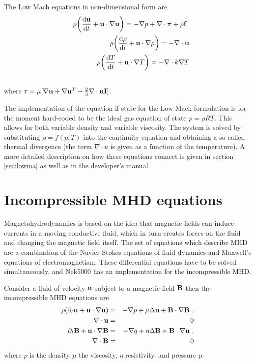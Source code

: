 The Low Mach equations in non-dimensional form are 
\begin{eqnarray}
&&\rho\bigg(\frac{\mathrm{d} \mathbf{u}}{\mathrm{d} t}+ \mathbf{u}\cdot\nabla\mathbf{u}\bigg)=-\nabla p+\nabla \cdot\boldsymbol{\tau}+\rho\mathbf{f}\ \\ \nonumber
&&\rho\bigg(\frac{\mathrm{d} \mathbf{\rho}}{\mathrm{d} t}+ \mathbf{u}\cdot\nabla\mathbf{\rho}\bigg)=-\nabla \cdot \mathbf{u}\\ \nonumber
&&\rho\bigg(\frac{\mathrm{d} T}{\mathrm{d} t}+ \mathbf{u}\cdot\nabla T\bigg)=-\nabla \cdot k \nabla T\\ \nonumber
\end{eqnarray}
where \(\tau=\mu[\nabla \mathbf{u}+\nabla \mathbf{u}^{T}-\frac{2}{3}\nabla \cdot \mathbf{u} \mathbf{I}]\).


The implementation of the equation if state for the Low Mach formulation is for the moment hard-coded to be the ideal gas equation of state \(p=\rho R T\). This allows for both variable density and variable viscosity. The system is solved by substituting \(\rho=f(p,T)\) into the continuity equation and obtaining a so-called thermal divergence (the term \(\nabla \cdot u\) is given as a function of the temperature).
A more detailed description on how these equations connect is given in section \ref{sec:lowma} as well as in the developer's manual.

\section{Incompressible MHD equations}\label{sec:mhd}
Magnetohydrodynamics is based on the idea that magnetic fields can induce currents in a moving conductive fluid, which in turn creates forces on the fluid and changing the magnetic field itself. The set of equations which describe MHD are a combination of the Navier-Stokes equations of fluid dynamics and Maxwell's equations of electromagnetism. These differential equations have to be solved simultaneously, and Nek5000 has an implementation for the incompressible MHD.

Consider a fluid of velocity \(\mathbf{u}\) subject to a magnetic field \(\mathbf{B}\) then the incompressible MHD equations are
\begin{eqnarray}
 \rho(\partial_{t} \mathbf u + \mathbf u \cdot \nabla \mathbf u) &=& - \nabla p + \mu \Delta \mathbf u + \bB\cdot \nabla \bB \ ,\\ 
 \nabla \cdot \mathbf u & =& 0\\ \nonumber
   \partial_{t} \bB + \mathbf u \cdot \nabla \bB &=& - \nabla q + \eta \Delta \bB + \bB\cdot \nabla \mathbf u \ ,\\ 
    \nabla \cdot \bB & =& 0 \nonumber
\end{eqnarray}
where \(\rho\) is the density \(\mu\) the viscosity, \(\eta\) resistivity, and pressure \(p\).


